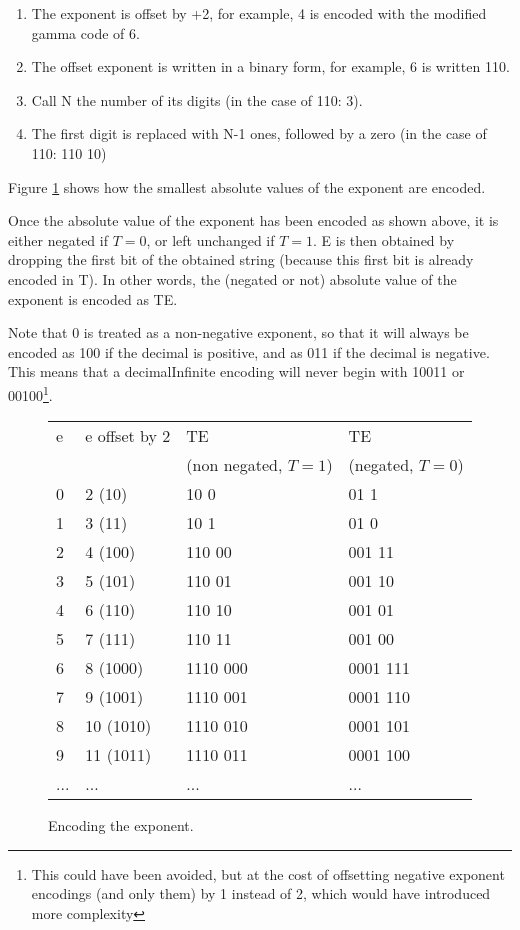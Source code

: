 \documentclass{acm_proc_article-sp}
\begin{document}
\label{section-exponent-encoding}
\begin{enumerate}
\item The exponent is offset by +2, for example, 4 is encoded with the modified gamma code of 6. 
\item  The offset exponent is written in a binary form, for example, 6 is written 110.
\item  Call N the number of its digits (in the case of 110: 3).
\item  The first digit is replaced with N-1 ones, followed by a zero (in the case of 110: 110 10)
\end{enumerate}

Figure \ref{figure-exponent-encoding} shows how the smallest absolute values of the exponent are encoded.

Once the absolute value of the exponent has been encoded as shown above, it is either negated if $T=0$, or left unchanged if $T=1$. E is then obtained by dropping the first bit of the obtained string (because this first bit is already encoded in T). In other words, the (negated or not) absolute value of the exponent is encoded as TE.

Note that 0 is treated as a non-negative exponent, so that it will always be encoded as 100 if the decimal is positive, and as 011 if the decimal is negative. This means that a decimalInfinite encoding will never begin with 10011 or 00100\footnote{This could have been avoided, but at the cost of offsetting negative exponent encodings (and only them) by 1 instead of 2, which would have introduced more complexity}.

\begin{figure}
\caption{Encoding the exponent.}
\label{figure-exponent-encoding}
\center
\begin{tabular}{|l|l|l|l|}
\hline
e & e offset by 2 & TE & TE\\
  &  & (non negated, $T=1$) & (negated, $T=0$)\\
\hline
0 & 2 (10) & 10 0 & 01 1  \\
\hline
1 & 3 (11) & 10 1  & 01 0\\
\hline
2 & 4 (100) & 110 00  & 001 11\\
\hline
3 & 5 (101) & 110 01 & 001 10\\
\hline
4 & 6 (110) & 110 10 & 001 01\\
\hline
5 & 7 (111) & 110 11 & 001 00\\
\hline
6 & 8 (1000) & 1110 000 & 0001 111\\
\hline
7 & 9 (1001) & 1110 001 & 0001 110\\
\hline
8 & 10 (1010) & 1110 010 & 0001 101\\
\hline
9 & 11 (1011) & 1110 011 & 0001 100\\
\hline
... & ... & ...& ...\\
\hline
\end{tabular}
\end{figure}
\end{document}
